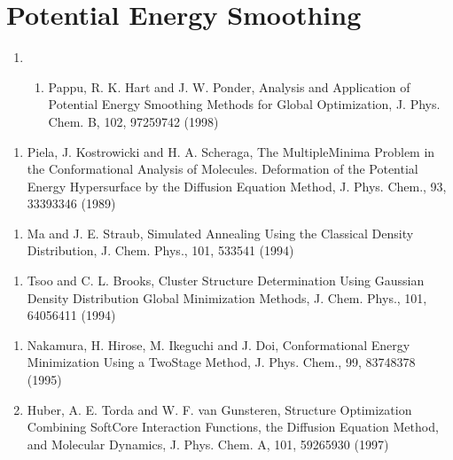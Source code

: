 \documentclass[letterpaper,11pt,english]{sphinxmanual}
\begin{document}
\section{Potential Energy Smoothing}
\label{\detokenize{text/references:potential-energy-smoothing}}\begin{enumerate}
%
\setcounter{enumi}{17}
\item {} \begin{enumerate}
%
\setcounter{enumii}{21}
\item {} 
Pappu, R. K. Hart and J. W. Ponder, Analysis and Application of Potential Energy Smoothing Methods for Global Optimization, J. Phys. Chem. B, 102, 9725\sphinxhyphen{}9742 (1998)

\end{enumerate}

\end{enumerate}
\begin{enumerate}
%
\setcounter{enumi}{11}
\item {} 
Piela, J. Kostrowicki and H. A. Scheraga, The Multiple\sphinxhyphen{}Minima Problem in the Conformational Analysis of Molecules. Deformation of the Potential Energy Hypersurface by the Diffusion Equation Method, J. Phys. Chem., 93, 3339\sphinxhyphen{}3346 (1989)

\end{enumerate}
\begin{enumerate}
%
\setcounter{enumi}{9}
\item {} 
Ma and J. E. Straub, Simulated Annealing Using the Classical Density Distribution, J. Chem. Phys., 101, 533\sphinxhyphen{}541 (1994)

\end{enumerate}
\begin{enumerate}
%
\setcounter{enumi}{2}
\item {} 
Tsoo and C. L. Brooks, Cluster Structure Determination Using Gaussian Density Distribution Global Minimization Methods, J. Chem. Phys., 101, 6405\sphinxhyphen{}6411 (1994)

\end{enumerate}
\begin{enumerate}
%
\setcounter{enumi}{18}
\item {} 
Nakamura, H. Hirose, M. Ikeguchi and J. Doi, Conformational Energy Minimization Using a Two\sphinxhyphen{}Stage Method, J. Phys. Chem., 99, 8374\sphinxhyphen{}8378 (1995)

\item {} 
Huber, A. E. Torda and W. F. van Gunsteren, Structure Optimization Combining Soft\sphinxhyphen{}Core Interaction Functions, the Diffusion Equation Method, and Molecular Dynamics, J. Phys. Chem. A, 101, 5926\sphinxhyphen{}5930 (1997)

\end{enumerate}
\end{document}
